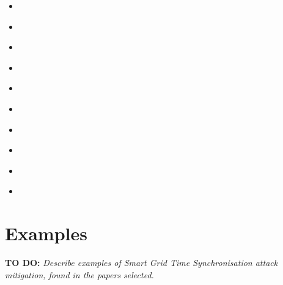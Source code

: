     \begin{itemize}
    
    \item  \cite{ZhangTimeSync2013}  
    
    \item  \cite{risbud2018vulnerability} 

    \item  \cite{cui2019spatio}  

    \item  \cite{almas2017vulnerability} 
    
    \item  \cite{garofalo2013gps} 

    \item  \cite{chauhan2021spoofing} 

    \item  \cite{qiu2020multi}  

    \item  \cite{orouji2021multi}  


    \item  \cite{mina2019gps}  

    \item  \cite{alghamdi2021precision} 



    \end{itemize}
      



\section{Examples}

\textbf{TO DO:}
\textit{Describe examples of Smart Grid Time Synchronisation attack mitigation, found in the papers selected.} \\ 

